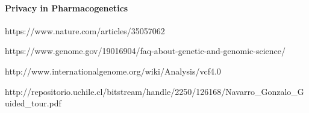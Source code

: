 \paragraph{Privacy in Pharmacogenetics}

\begin{thebibliography}{4}
  
  https://www.nature.com/articles/35057062

  https://www.genome.gov/19016904/faq-about-genetic-and-genomic-science/

  http://www.internationalgenome.org/wiki/Analysis/vcf4.0
  
  http://repositorio.uchile.cl/bitstream\-/handle/2250/126168/Navarro\_Gonzalo\-\_Guided\_tour.pdf

\end{thebibliography}

